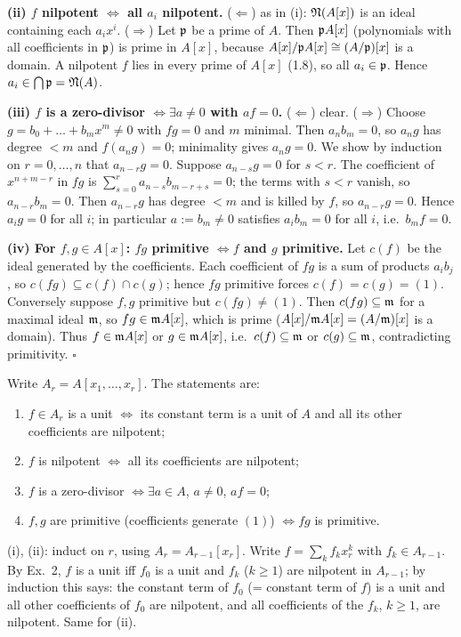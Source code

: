 \documentclass[11pt]{article}
\begin{document}
\textbf{(ii) $f$ nilpotent $\iff$ all $a_i$ nilpotent.} ($\Leftarrow$) as in (i): $\mathfrak N(A[x])$ is an ideal containing each $a_ix^i$. ($\Rightarrow$) Let $\mathfrak p$ be a prime of $A$. Then $\mathfrak p A[x]$ (polynomials with all coefficients in $\mathfrak p$) is prime in $A[x]$, because $A[x]/\mathfrak p A[x]\cong(A/\mathfrak p)[x]$ is a domain. A nilpotent $f$ lies in every prime of $A[x]$ (1.8), so all $a_i\in\mathfrak p$. Hence $a_i\in\bigcap\mathfrak p=\mathfrak N(A)$.

\textbf{(iii) $f$ is a zero-divisor $\iff\exists a\ne0$ with $af=0$.} ($\Leftarrow$) clear. ($\Rightarrow$) Choose $g=b_0+\dots+b_mx^m\ne0$ with $fg=0$ and $m$ minimal. Then $a_nb_m=0$, so $a_ng$ has degree $<m$ and $f(a_ng)=0$; minimality gives $a_ng=0$. We show by induction on $r=0,\dots,n$ that $a_{n-r}g=0$. Suppose $a_{n-s}g=0$ for $s<r$. The coefficient of $x^{n+m-r}$ in $fg$ is $\sum_{s=0}^{r}a_{n-s}b_{m-r+s}=0$; the terms with $s<r$ vanish, so $a_{n-r}b_m=0$. Then $a_{n-r}g$ has degree $<m$ and is killed by $f$, so $a_{n-r}g=0$. Hence $a_ig=0$ for all $i$; in particular $a:=b_m\neq0$ satisfies $a_ib_m=0$ for all $i$, i.e.\ $b_mf=0$.

\textbf{(iv) For $f,g\in A[x]$: $fg$ primitive $\iff f$ and $g$ primitive.} Let $c(f)$ be the ideal generated by the coefficients. Each coefficient of $fg$ is a sum of products $a_ib_j$, so $c(fg)\subseteq c(f)\cap c(g)$; hence $fg$ primitive forces $c(f)=c(g)=(1)$. Conversely suppose $f,g$ primitive but $c(fg)\ne(1)$. Then $c(fg)\subseteq\mathfrak m$ for a maximal ideal $\mathfrak m$, so $fg\in\mathfrak m A[x]$, which is prime ($A[x]/\mathfrak m A[x]=(A/\mathfrak m)[x]$ is a domain). Thus $f\in\mathfrak m A[x]$ or $g\in\mathfrak m A[x]$, i.e.\ $c(f)\subseteq\mathfrak m$ or $c(g)\subseteq\mathfrak m$, contradicting primitivity. \hfill$\square$

\pf
Write $A_r=A[x_1,\dots,x_r]$. The statements are:
\begin{enumerate}[label=(\roman*),leftmargin=*]
\item $f\in A_r$ is a unit $\iff$ its constant term is a unit of $A$ and all its other coefficients are nilpotent;
\item $f$ is nilpotent $\iff$ all its coefficients are nilpotent;
\item $f$ is a zero-divisor $\iff\exists a\in A$, $a\ne0$, $af=0$;
\item $f,g$ are primitive (coefficients generate $(1)$) $\iff fg$ is primitive.
\end{enumerate}
(i), (ii): induct on $r$, using $A_r=A_{r-1}[x_r]$. Write $f=\sum_kf_kx_r^k$ with $f_k\in A_{r-1}$. By Ex.~2, $f$ is a unit iff $f_0$ is a unit and $f_k$ ($k\ge1$) are nilpotent in $A_{r-1}$; by induction this says: the constant term of $f_0$ (= constant term of $f$) is a unit and all other coefficients of $f_0$ are nilpotent, and all coefficients of the $f_k$, $k\ge1$, are nilpotent. Same for (ii).
\end{document}
